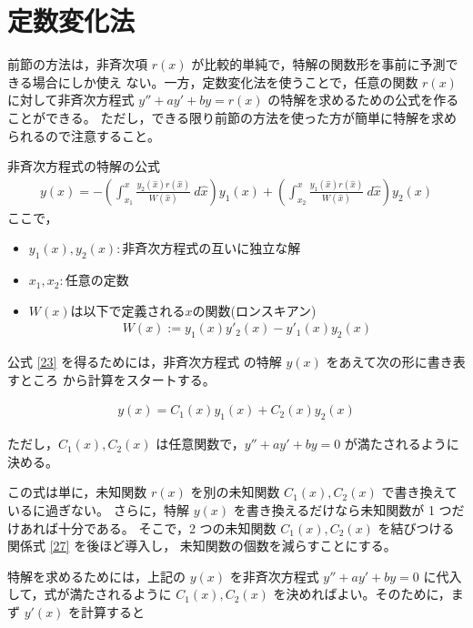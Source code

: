 \documentclass[10pt, a4paper]{ltjsarticle}
\begin{document}
\pagestyle{appendixPS}

\section{定数変化法}
前節の方法は，非斉次項 $r(x)$ が比較的単純で，特解の関数形を事前に予測できる場合にしか使え
ない。一方，定数変化法を使うことで，任意の関数 $r(x)$ に対して非斉次方程式 
$y'' + ay' + by = r(x)$ の特解を求めるための公式を作ることができる。
ただし，できる限り前節の方法を使った方が簡単に特解を求められるので注意すること。

\begin{itembox}[l]{非斉次方程式の特解の公式}
  \begin{gather}
    y(x) 
    = -\left( \int_{x_1}^{x}\frac{y_2(\hat{x})r(\hat{x})}{W(\hat{x})}\:d\hat{x} \right) y_1(x)
    + \left(\int_{x_2}^{x}\frac{y_1(\hat{x})r(\hat{x})}{W(\hat{x})}\:d\hat{x}\right)y_2(x) \label{23}
  \end{gather}
  ここで，
  
  \begin{itemize}
    \item $y_1(x),y_2(x)\colon$非斉次方程式の互いに独立な解 
    \item $x_1,x_2\colon$任意の定数
    \item $W(x)$は以下で定義される$x$の関数(ロンスキアン)
    \begin{gather}
      W(x) := y_1(x)y'_2(x) - y'_1(x)y_2(x) \label{24}
    \end{gather}
  \end{itemize}
\end{itembox}


公式 \eqref{23} を得るためには，非斉次方程式 の特解
 $y(x)$ をあえて次の形に書き表すところ
から計算をスタートする。

\begin{gather}
  y(x) = C_1(x)y_1(x) + C_2(x)y_2(x) \label{25}
\end{gather}

ただし，$C_1(x), C_2(x)$ は任意関数で，$y'' + ay' + by=0$ が満たされるように決める。

この式は単に，未知関数 $r(x)$ を別の未知関数 $C_1(x), C_2(x)$ で書き換えているに過ぎない。
さらに，特解 $y(x)$ を書き換えるだけなら未知関数が 1 つだけあれば十分である。
そこで，2 つの未知関数 $C_1(x), C_2(x)$ を結びつける関係式 \eqref{27} を後ほど導入し，
未知関数の個数を減らすことにする。

特解を求めるためには，上記の $y(x)$ を非斉次方程式 $y'' + ay' + by=0$ に代入して，式が満たされるように
$C_1(x), C_2(x)$ を決めればよい。そのために，まず $y'(x)$ を計算すると
\end{document}
